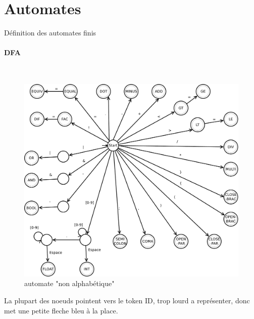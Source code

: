 \documentclass[a4paper,10pt]{article}
\begin{document}
\section{Automates}

Définition des automates finis
~\\
\paragraph{DFA}~\\

 \begin{figure}[H] \hspace*{-2cm} 
    \centering
   	  \includegraphics[width=400pt]{automate1.pdf} 
			\caption{automate "non alphabétique"}
			\label{automate1}
  \end{figure}	
  
	La plupart des noeuds pointent vers le token ID, trop lourd a représenter, donc met une petite fleche bleu à la place.  
  
\end{document}
